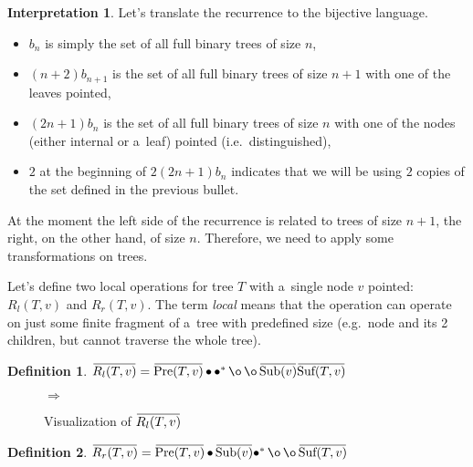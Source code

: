 \documentclass[final]{article}
\theoremstyle{definition}
\newtheorem{definition}{Definition}[subsection]
\theoremstyle{definition}
\newtheorem{interpretation}{Interpretation}[subsection]
\theoremstyle{remark}
\newcommand{\ols}[1]{\mskip.5\thinmuskip\overline{\mskip-.5\thinmuskip {#1} \mskip-.5\thinmuskip}\mskip.5\thinmuskip} %
\newcommand{\enc}[1]{\ensuremath{\ols{#1}}}
\newcommand{\pointed}[1]{\ensuremath{{#1}^*}}
\DeclareMathOperator{\tSub}{\text{Sub}}
\DeclareMathOperator{\tPre}{\text{Pre}}
\DeclareMathOperator{\tSuf}{\text{Suf}}
\DeclareMathOperator{\n}{\bullet}
\DeclareMathOperator{\no}{\o}
\begin{document}
\begin{interpretation}
Let's translate the recurrence to the bijective language.
\begin{itemize}
    \item \(b_n\) is simply the set of all full binary trees of size \(n\),
    \item \((n + 2) b_{n + 1}\) is the set of all full binary trees of size \(n + 1\) with one of the leaves pointed,
    \item \((2n + 1) b_{n}\) is the set of all full binary trees of size \(n\) with one of the nodes (either internal or a~leaf) pointed (i.e.~distinguished),
    \item \(2\) at the beginning of \(2 (2n + 1) b_{n}\) indicates that we will be using \(2\) copies of the set defined in the previous bullet.
\end{itemize}

At the moment the left side of the recurrence is related to trees of size \(n + 1\), the right, on the other hand, of size \(n\). Therefore, we need to apply some transformations on trees.

Let's define two local operations for tree \(T\) with a~single node \(v\) pointed: \(R_l(T, v)\) and \(R_r(T, v)\). The term \textit{local} means that the operation can operate on just some finite fragment of a~tree with predefined size (e.g.~node and its 2 children, but cannot traverse the whole tree).

\begin{definition}
    \(\enc{R_l(T, v)} = \enc{\tPre(T, v)} \n \pointed{\n} \no \no \enc{\tSub(v)} \enc{\tSuf(T, v)}\)
\end{definition}

\begin{figure}[H]
    \centering
    \begin{minipage}{.25\textwidth}\end{minipage}%
    \(\Rightarrow\)
    \begin{minipage}{.4\textwidth}\end{minipage}%
    \caption{Visualization of \(\enc{R_l(T, v)}\)}%
    \label{fig:remy_left}
\end{figure}

\begin{definition}
    \(\enc{R_r(T, v)} = \enc{\tPre(T, v)} \n \enc{\tSub(v)} \pointed{\n} \no \no \enc{\tSuf(T, v)} \)
\end{definition}


\end{interpretation}
\end{document}

